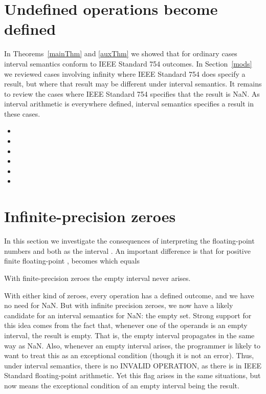\documentclass[11pt]{article}
\begin{document}
\section{Undefined operations become defined}
\label{undefDef}

In Theorems~\ref{mainThm} and \ref{auxThm} we showed that for ordinary
cases interval semantics conform to IEEE Standard 754 outcomes.  In
Section~\ref{mods} we reviewed cases involving infinity where IEEE
Standard 754 does specify a result, but where that result may be
different under interval semantics. It remains to review the cases
where IEEE Standard 754 specifies that the result is NaN. As interval
arithmetic is everywhere defined, interval semantics specifies a
result in these cases.
\begin{itemize}
\item

\item

\item

\item

\item

\item

\end{itemize}

\section{Infinite-precision zeroes}
\label{altSem}

In this section we investigate the consequences of interpreting the
floating-point numbers  and  both as the interval .  An
important difference is that for positive finite floating-point ,
 becomes  which equals

With finite-precision zeroes the empty interval never arises.

With either kind of zeroes, every operation has a defined outcome, and
we have no need for NaN.  But with infinite precision zeroes, we
now have a likely candidate for an interval semantics for NaN: the
empty set. Strong support for this idea comes from the fact that,
whenever one of the operands is an empty interval, the result is
empty. That is, the empty interval propagates in the same way as
NaN. Also, whenever an empty interval arises, the programmer is likely to
want to treat this as an exceptional condition (though it is not an
error). Thus, under interval semantics, there is no INVALID OPERATION,
as there is in IEEE Standard floating-point arithmetic. Yet this flag
arises in the same situations, but now means the exceptional condition
of an empty interval being the result.
\end{document}
